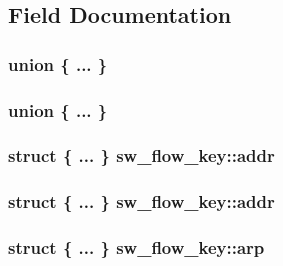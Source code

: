 \subsection{Field Documentation}
\hypertarget{structsw__flow__key_afbbeb90ecc1f7acfb38798dbe397d562}{}\subsubsection[{"@3}]{\setlength{\rightskip}{0pt plus 5cm}union \{ ... \} }\label{structsw__flow__key_afbbeb90ecc1f7acfb38798dbe397d562}
\hypertarget{structsw__flow__key_a01fc9d1c4d8141a0cb1a18162814f42b}{}\subsubsection[{"@6}]{\setlength{\rightskip}{0pt plus 5cm}union \{ ... \} }\label{structsw__flow__key_a01fc9d1c4d8141a0cb1a18162814f42b}
\hypertarget{structsw__flow__key_abfc28adb05f413bcc53e68c773144f0a}{}
\subsubsection[{addr}]{\setlength{\rightskip}{0pt plus 5cm}struct \{ ... \}   sw\+\_\+flow\+\_\+key\+::addr}\label{structsw__flow__key_abfc28adb05f413bcc53e68c773144f0a}
\hypertarget{structsw__flow__key_a60452748303b04851a89b07ecd39b94a}{}
\subsubsection[{addr}]{\setlength{\rightskip}{0pt plus 5cm}struct \{ ... \}   sw\+\_\+flow\+\_\+key\+::addr}\label{structsw__flow__key_a60452748303b04851a89b07ecd39b94a}
\hypertarget{structsw__flow__key_a0932eb34cba8111bb3b37bf106ba7a59}{}
\subsubsection[{arp}]{\setlength{\rightskip}{0pt plus 5cm}struct \{ ... \}   sw\+\_\+flow\+\_\+key\+::arp}\label{structsw__flow__key_a0932eb34cba8111bb3b37bf106ba7a59}
\hypertarget{structsw__flow__key_a44a0cdfe7471df8bb73762085da4cda9}{}
